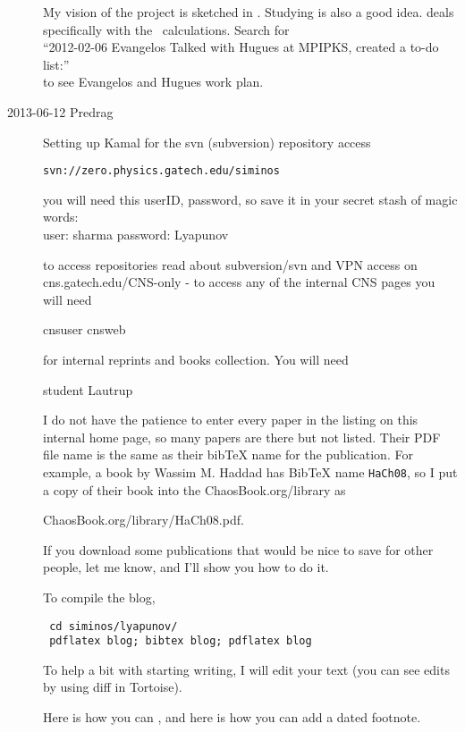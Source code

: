 \begin{description}
My vision of the project is sketched in . Studying  is also a good idea.
 deals specifically with the \KS\ calculations.
Search for\\
``2012-02-06 Evangelos Talked with Hugues at MPIPKS, created a to-do list:''
\\
to see Evangelos and Hugues work plan.

\item[2013-06-12 Predrag] 
Setting up Kamal for the svn (subversion) repository access 

\texttt{svn://zero.physics.gatech.edu/siminos}

you will
need this userID, password, so save it in your secret stash of magic
words:
\\
user: sharma  password: Lyapunov

to access repositories read about subversion/svn and VPN access
on
 {cns.gatech.edu/CNS-only} - to access any
of the internal CNS pages you will need

cnsuser           cnsweb

 for internal reprints and
books collection. You will need

student           Lautrup

I do not have the patience to enter every paper in the listing on this
internal home page, so many papers are there but not listed. Their PDF file
name is the same as their bibTeX name for the publication. For example, a
book by Wassim M. Haddad has BibTeX name
\texttt{HaCh08}, so I put a copy of their book into the
ChaosBook.org/library as

{ChaosBook.org/library/HaCh08.pdf}.

If you download some publications that would be nice to save for other
people, let me know, and I'll show you how to do it.

To compile the blog, 
\begin{verbatim}
 cd siminos/lyapunov/
 pdflatex blog; bibtex blog; pdflatex blog
\end{verbatim}

To help a bit with starting writing, I will
edit your text (you can see edits by using diff in Tortoise).

Here is how you can
, and here is how you can add a dated
footnote.


\end{description}
